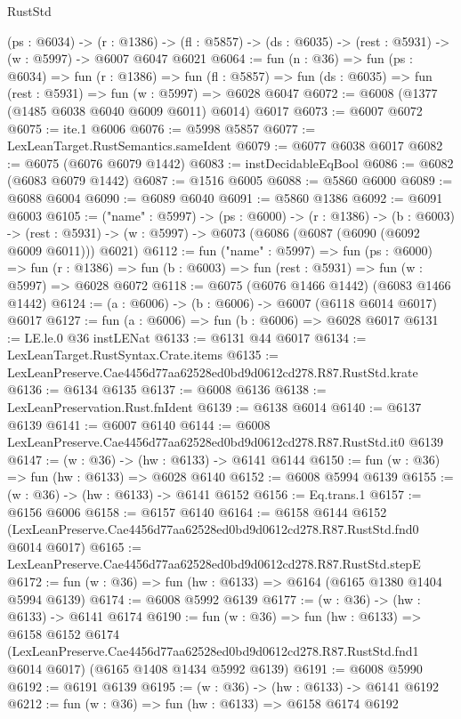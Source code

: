 \begin{lexlean}{RustStd}
\begin{coremodule}
{{  (ps : @6034) ->
  (r : @1386) -> (fl : @5857) -> (ds : @6035) -> (rest : @5931) -> (w : @5997) -> @6007 @6047 @6021
@6064 := fun (n : @36) =>
  fun (ps : @6034) =>
  fun (r : @1386) =>
  fun (fl : @5857) => fun (ds : @6035) => fun (rest : @5931) => fun (w : @5997) => @6028 @6047
@6072 := @6008 (@1377 (@1485 @6038 @6040 @6009 @6011) @6014) @6017
@6073 := @6007 @6072
@6075 := ite.{1} @6006
@6076 := @5998 @5857
@6077 := LexLeanTarget.RustSemantics.sameIdent
@6079 := @6077 @6038 @6017
@6082 := @6075 (@6076 @6079 @1442)
@6083 := instDecidableEqBool
@6086 := @6082 (@6083 @6079 @1442)
@6087 := @1516 @6005
@6088 := @5860 @6000
@6089 := @6088 @6004
@6090 := @6089 @6040
@6091 := @5860 @1386
@6092 := @6091 @6003
@6105 := ("name" : @5997) ->
  (ps : @6000) ->
  (r : @1386) ->
  (b : @6003) ->
  (rest : @5931) -> (w : @5997) -> @6073 (@6086 (@6087 (@6090 (@6092 @6009 @6011))) @6021)
@6112 := fun ("name" : @5997) =>
  fun (ps : @6000) =>
  fun (r : @1386) => fun (b : @6003) => fun (rest : @5931) => fun (w : @5997) => @6028 @6072
@6118 := @6075 (@6076 @1466 @1442) (@6083 @1466 @1442)
@6124 := (a : @6006) -> (b : @6006) -> @6007 (@6118 @6014 @6017) @6017
@6127 := fun (a : @6006) => fun (b : @6006) => @6028 @6017
@6131 := LE.le.{0} @36 instLENat
@6133 := @6131 @44 @6017
@6134 := LexLeanTarget.RustSyntax.Crate.items
@6135 := LexLeanPreserve.Cae4456d77aa62528ed0bd9d0612cd278.R87.RustStd.krate
@6136 := @6134 @6135
@6137 := @6008 @6136
@6138 := LexLeanPreservation.Rust.fnIdent
@6139 := @6138 @6014
@6140 := @6137 @6139
@6141 := @6007 @6140
@6144 := @6008 LexLeanPreserve.Cae4456d77aa62528ed0bd9d0612cd278.R87.RustStd.it0 @6139
@6147 := (w : @36) -> (hw : @6133) -> @6141 @6144
@6150 := fun (w : @36) => fun (hw : @6133) => @6028 @6140
@6152 := @6008 @5994 @6139
@6155 := (w : @36) -> (hw : @6133) -> @6141 @6152
@6156 := Eq.trans.{1}
@6157 := @6156 @6006
@6158 := @6157 @6140
@6164 := @6158
    @6144
    @6152
    (LexLeanPreserve.Cae4456d77aa62528ed0bd9d0612cd278.R87.RustStd.fnd0 @6014 @6017)
@6165 := LexLeanPreserve.Cae4456d77aa62528ed0bd9d0612cd278.R87.RustStd.stepE
@6172 := fun (w : @36) => fun (hw : @6133) => @6164 (@6165 @1380 @1404 @5994 @6139)
@6174 := @6008 @5992 @6139
@6177 := (w : @36) -> (hw : @6133) -> @6141 @6174
@6190 := fun (w : @36) =>
  fun (hw : @6133) =>
  @6158
    @6152
    @6174
    (LexLeanPreserve.Cae4456d77aa62528ed0bd9d0612cd278.R87.RustStd.fnd1 @6014 @6017)
    (@6165 @1408 @1434 @5992 @6139)
@6191 := @6008 @5990
@6192 := @6191 @6139
@6195 := (w : @36) -> (hw : @6133) -> @6141 @6192
@6212 := fun (w : @36) =>
  fun (hw : @6133) =>
  @6158
    @6174
    @6192
}}
\end{coremodule}
\end{lexlean}
